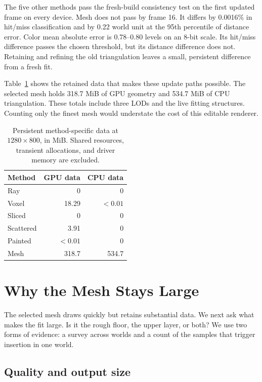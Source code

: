 \documentclass{jcgt}
\begin{document}
The five other methods pass the fresh-build consistency test on the first updated frame on every device. Mesh does not pass by frame 16. It differs by 0.0016\% in hit/miss classification and by 0.22 world unit at the 95th percentile of distance error. Color mean absolute error is 0.78--0.80 levels on an 8-bit scale. Its hit/miss difference passes the chosen threshold, but its distance difference does not. Retaining and refining the old triangulation leaves a small, persistent difference from a fresh fit.

Table~\ref{tab:memory} shows the retained data that makes these update paths possible. The selected mesh holds 318.7 MiB of GPU geometry and 534.7 MiB of CPU triangulation. These totals include three LODs and the live fitting structures. Counting only the finest mesh would understate the cost of this editable renderer.

\begin{table}[tbp]\centering\small
\caption{Persistent method-specific data at $1280\times800$, in MiB. Shared resources, transient allocations, and driver memory are excluded.}\label{tab:memory}
\begin{tabular}{@{}lrr@{}}
\toprule
Method & GPU data & CPU data \\
\midrule
Ray & 0 & 0 \\
Voxel & 18.29 & $<0.01$ \\
Sliced & 0 & 0 \\
Scattered & 3.91 & 0 \\
Painted & $<0.01$ & 0 \\
Mesh & 318.7 & 534.7 \\
\bottomrule
\end{tabular}
\end{table}

\FloatBarrier
\section{Why the Mesh Stays Large}\label{sec:fit}

The selected mesh draws quickly but retains substantial data. We next ask what makes the fit large. Is it the rough floor, the upper layer, or both? We use two forms of evidence: a survey across worlds and a count of the samples that trigger insertion in one world.

\subsection{Quality and output size}\label{sec:fit-quality}
\end{document}
